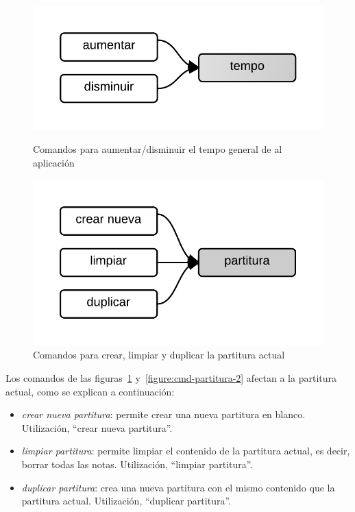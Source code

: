 \begin{figure}[H]
\begin{minipage}[b]{0.5\linewidth}
\centering
\includegraphics[width=0.6\linewidth]{./graphics/cmd-tempo.png}
\caption{Comandos para aumentar/disminuir el tempo general de al aplicaci\'on}
\label{figure:cmd-tempo}
\end{minipage}
\quad
\begin{minipage}[b]{0.5\linewidth}
\centering
\includegraphics[width=0.6\linewidth]{./graphics/partitura-1.png}
\caption{Comandos para crear, limpiar y duplicar la partitura actual}
\label{figure:cmd-partitura-1}
\end{minipage}
\end{figure}

Los comandos de las figuras~\ref{figure:cmd-partitura-1} y~\ref{figure:cmd-partitura-2} afectan a
la partitura actual, como se explican a continuaci\'on:

\begin{itemize}
    \item \emph{crear nueva  partitura}:  permite crear una nueva partitura en blanco. Utilizaci\'on, 
    ``crear nueva partitura''.
    \item \emph{limpiar  partitura}: permite limpiar el contenido de la partitura actual, es decir, 
    borrar todas las notas. Utilizaci\'on, ``limpiar partitura''.
    \item \emph{duplicar partitura}: crea una nueva partitura con el mismo contenido que la partitura 
    actual. Utilizaci\'on, ``duplicar partitura''.
\end{itemize}

